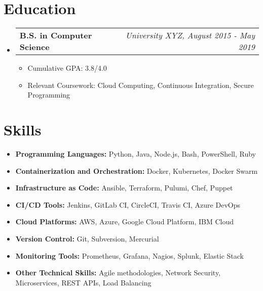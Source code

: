 \documentclass[a4paper,10pt]{article}
\begin{document}

\section*{Education}
\begin{itemize}[left=0pt]
  \item 
  \begin{tabular}{p{} r}
      \textbf{B.S. in Computer Science} & \textit{University XYZ, August 2015 - May 2019} \\
  \end{tabular}
  \begin{itemize}[left=0pt]
      \item Cumulative GPA: 3.8/4.0
      \item Relevant Coursework: Cloud Computing, Continuous Integration, Secure Programming
  \end{itemize}
\end{itemize}


\section*{Skills}
\begin{itemize}[left=0pt]
  \item \textbf{Programming Languages:} Python, Java, Node.js, Bash, PowerShell, Ruby
  \item \textbf{Containerization and Orchestration:} Docker, Kubernetes, Docker Swarm
  \item \textbf{Infrastructure as Code:} Ansible, Terraform, Pulumi, Chef, Puppet
  \item \textbf{CI/CD Tools:} Jenkins, GitLab CI, CircleCI, Travis CI, Azure DevOps
  \item \textbf{Cloud Platforms:} AWS, Azure, Google Cloud Platform, IBM Cloud
  \item \textbf{Version Control:} Git, Subversion, Mercurial
  \item \textbf{Monitoring Tools:} Prometheus, Grafana, Nagios, Splunk, Elastic Stack
  \item \textbf{Other Technical Skills:} Agile methodologies, Network Security, Microservices, REST APIs, Load Balancing
\end{itemize}
\end{document}
